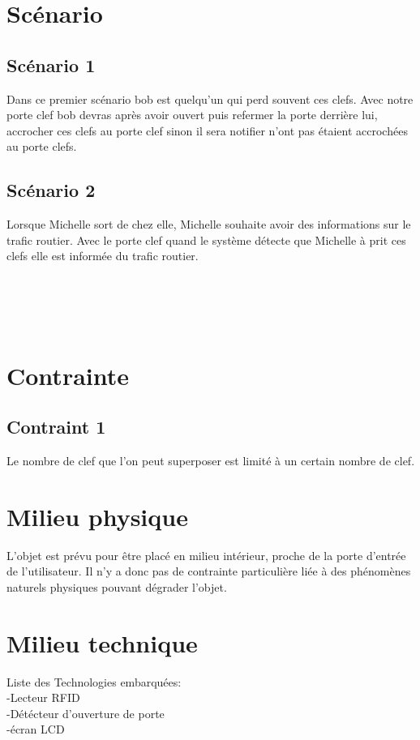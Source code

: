 \documentclass[12pt]{article}
\begin{document}
\maketitle
\section{Scénario}
\subsection{Scénario 1}

Dans ce premier scénario bob est quelqu'un qui perd souvent ces clefs. Avec notre porte clef bob devras après avoir ouvert puis refermer la porte derrière lui, accrocher ces clefs au porte clef sinon il sera notifier n'ont pas étaient accrochées au porte clefs.

\subsection{Scénario 2}

Lorsque Michelle sort de chez elle, Michelle souhaite avoir des informations sur le trafic routier. Avec le porte clef quand le système détecte que Michelle à prit ces clefs elle est informée du trafic routier.\\\\\\\\\\

\section{Contrainte}

\subsection{Contraint 1}
Le nombre de clef que l'on peut superposer est limité à un certain nombre de clef.

\section{Milieu physique}

L’objet est prévu pour être placé en milieu intérieur, proche de la porte d'entrée de
l’utilisateur. Il n’y a donc pas de contrainte particulière liée à des phénomènes
naturels physiques pouvant dégrader l’objet.

\section{Milieu technique}
Liste des Technologies embarquées:\\
-Lecteur RFID\\
-Détécteur d'ouverture de porte\\
-écran LCD\\
\end{document}
